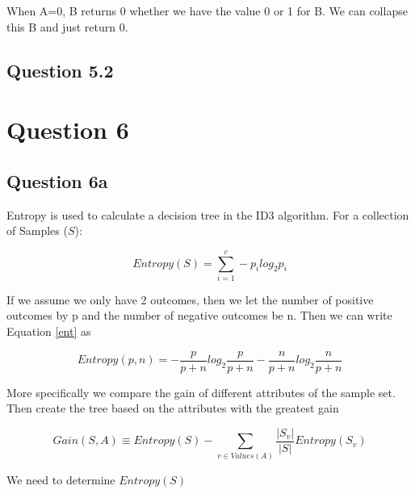\documentclass[10pt,a4paper]{article}
\begin{document}
When A=0, B returns 0 whether we have the value 0 or 1 for B. We can collapse this B and just return 0.


\subsection{Question 5.2}
\section{Question 6}
\subsection{Question 6a}

Entropy is used to calculate a decision tree in the ID3 algorithm. For a collection of Samples ($S$):

\begin{equation}
\label{ent}
Entropy(S) = \sum_{i=1}^c -p_i log_2p_i
\end{equation}

If we assume we only have 2 outcomes, then we let the number of positive outcomes by p and the number of negative outcomes be n. Then we can write Equation \ref{ent} as

\begin{equation}
Entropy(p,n) = -\frac{p}{p+n}log_2\frac{p}{p+n} - \frac{n}{p+n}log_2\frac{n}{p+n} 
\end{equation}
 
More specifically we compare the gain of different attributes of the sample set. Then create the tree based on the attributes with the greatest gain

\begin{equation}
Gain(S,A) \equiv Entropy(S) - \sum_{v \in Values(A)} \frac{\vert S_v\vert}{\vert S\vert}Entropy(S_v)
\end{equation}

We need to determine $Entropy(S)$
\end{document}
